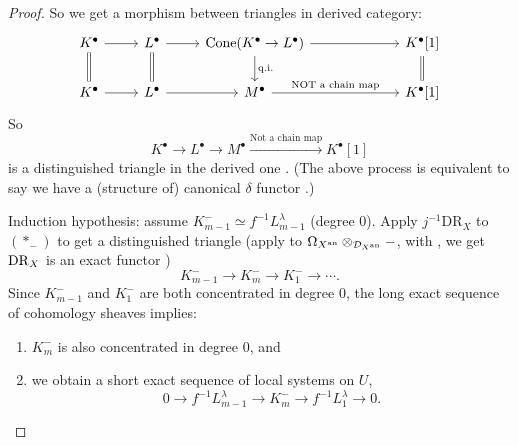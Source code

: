 \begin{proof}
    So we get a morphism between triangles in derived category:
    \[
        \begin{tikzcd}
            K^\bullet \arrow[r] \arrow[d, equal] & L^\bullet \arrow[r] \arrow[d, equal] & \mathrm{Cone}(K^\bullet\to L^\bullet) \arrow[r] \arrow[d, "\text{q.i.}"] &[4em] K^\bullet[1] \arrow[d, equal] \\
            K^\bullet \arrow[r]                  & L^\bullet \arrow[r]                  & M^\bullet \arrow[r,"\text{NOT a chain map}"]                                  & K^\bullet[1]
        \end{tikzcd}
    \]
    So
    \[
        K^\bullet \to L^\bullet \to M^\bullet \xrightarrow{\text{Not a chain map}} K^\bullet[1]
    \]
    is a distinguished triangle in the derived one \cite[\href{https://stacks.math.columbia.edu/tag/05RU}{Tag 05RU}, \href{https://stacks.math.columbia.edu/tag/05R6}{Tag 05R6} and TR1 of \href{https://stacks.math.columbia.edu/tag/0145}{Tag 0145}]{stacks-project}.
    (The above process is equivalent to say we have a (structure of) canonical $\delta$ functor \cite[\href{https://stacks.math.columbia.edu/tag/0152}{Tag 0152}, \href{https://stacks.math.columbia.edu/tag/0150}{Tag 0150}]{stacks-project}.)

    \medskip

    Induction hypothesis: assume $K_{m-1}^{-}\simeq f^{-1}L_{m-1}^\lambda$ (degree $0$).
    Apply $j^{-1}\mathrm{DR}_X$ to $(\ast_-)$ to get a distinguished triangle
    (apply \cite[\href{https://stacks.math.columbia.edu/tag/014X}{Tag 0G6E}]{stacks-project} to
    $\Omega_{X^{\mathrm{an}}} \otimes_{\mathcal{D}_{X^{\mathrm{an}}}} -$,
    with \cite[\href{https://stacks.math.columbia.edu/tag/05S8}{Tag 05S8} and \href{https://stacks.math.columbia.edu/tag/05SC}{Tag 05SC}]{stacks-project},
    we get $\mathrm{DR}_X$ is an exact functor \cite[\href{https://stacks.math.columbia.edu/tag/014V}{Tag 014V}]{stacks-project})
    \[
        K_{m-1}^{-}\to K_m^{-}\to K_1^{-}\to \cdots.
    \]
    Since $K_{m-1}^{-}$ and $K_1^{-}$ are both concentrated in degree $0$,
    the long exact sequence of cohomology sheaves \cite[TR2 in \href{https://stacks.math.columbia.edu/tag/0145}{Tag 0145}, \href{https://stacks.math.columbia.edu/tag/05QL}{Tag 05QL}, \href{https://stacks.math.columbia.edu/tag/0147}{Tag 0147}, \href{https://stacks.math.columbia.edu/tag/0148}{Tag 0148}, \href{https://stacks.math.columbia.edu/tag/05RS}{Tag 05RS} and \href{https://stacks.math.columbia.edu/tag/05RT}{Tag 05RT}]{stacks-project} implies:
    \begin{enumerate}
        \item $K_m^{-}$ is also concentrated in degree $0$, and
        \item we obtain a short exact sequence of local systems on $U$,
              \[
                  0\to f^{-1}L_{m-1}^\lambda \longrightarrow K_m^{-}\longrightarrow f^{-1}L_1^\lambda\to 0.
                  \tag{$\dagger$}
              \]
    \end{enumerate}


\end{proof}
